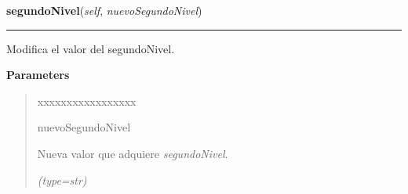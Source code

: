     \label{grafico:Grafico:segundoNivel}

    \vspace{0.5ex}

\hspace{.8\funcindent}\begin{boxedminipage}{\funcwidth}

    \raggedright \textbf{segundoNivel}(\textit{self}, \textit{nuevoSegundoNivel})

    \vspace{-1.5ex}

    \rule{\textwidth}{0.5\fboxrule}
\setlength{\parskip}{2ex}
    Modifica el valor del segundoNivel.

\setlength{\parskip}{1ex}
      \textbf{Parameters}
      \vspace{-1ex}

      \begin{quote}
        \begin{Ventry}{xxxxxxxxxxxxxxxxx}

          \item[nuevoSegundoNivel]

          Nueva valor que adquiere \textit{segundoNivel}.

            {\it (type=str)}

        \end{Ventry}

      \end{quote}

    \end{boxedminipage}

    \label{grafico:Grafico:setNumeroAlgunasCategorias}

    \vspace{0.5ex}

